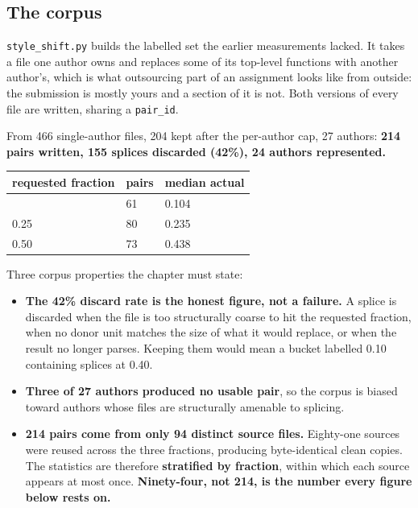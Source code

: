\hypertarget{the-corpus}{%
\subsection{The corpus}\label{the-corpus}}

\texttt{style\_shift.py} builds the labelled set the earlier
measurements lacked. It takes a file one author owns and replaces some
of its top-level functions with another author's, which is what
outsourcing part of an assignment looks like from outside: the
submission is mostly yours and a section of it is not. Both versions of
every file are written, sharing a \texttt{pair\_id}.

From 466 single-author files, 204 kept after the per-author cap, 27
authors: \textbf{214 pairs written, 155 splices discarded (42\%), 24
authors represented.}

\begin{longtable}[]{@{}lll@{}}
\toprule\noalign{}
requested fraction & pairs & median actual \\
\midrule\noalign{}
\endhead
\bottomrule\noalign{}
\endlastfoot
0.10 & 61 & 0.104 \\
0.25 & 80 & 0.235 \\
0.50 & 73 & 0.438 \\
\end{longtable}

Three corpus properties the chapter must state:

\begin{itemize}
\tightlist
\item
  \textbf{The 42\% discard rate is the honest figure, not a failure.} A
  splice is discarded when the file is too structurally coarse to hit
  the requested fraction, when no donor unit matches the size of what it
  would replace, or when the result no longer parses. Keeping them would
  mean a bucket labelled 0.10 containing splices at 0.40.
\item
  \textbf{Three of 27 authors produced no usable pair}, so the corpus is
  biased toward authors whose files are structurally amenable to
  splicing.
\item
  \textbf{214 pairs come from only 94 distinct source files.} Eighty-one
  sources were reused across the three fractions, producing
  byte-identical clean copies. The statistics are therefore
  \textbf{stratified by fraction}, within which each source appears at
  most once. \textbf{Ninety-four, not 214, is the number every figure
  below rests on.}
\end{itemize}

